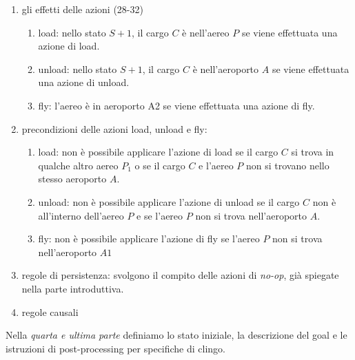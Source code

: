\begin{enumerate}
\item gli effetti delle azioni (28-32)
\begin{enumerate}
\item load: nello stato $S+1$, il cargo $C$ è nell'aereo $P$ se viene effettuata una azione di load.
\item unload: nello stato $S+1$, il cargo $C$ è nell'aeroporto $A$ se viene effettuata una azione di unload.
\item fly: l'aereo è in aeroporto A2 se viene effettuata una azione di fly.
\end{enumerate}

\item precondizioni delle azioni load, unload e fly:
\begin{enumerate}
\item load: non è possibile applicare l'azione di load se il cargo $C$ si trova in qualche altro aereo $P_1$ o se il cargo $C$ e l'aereo $P$ non si trovano nello stesso aeroporto $A$.
\item unload: non è possibile applicare l'azione di unload se il cargo $C$ non è all'interno dell'aereo $P$ e se l'aereo $P$ non si trova nell'aeroporto $A$.
\item fly: non è possibile applicare l'azione di fly se l'aereo $P$ non si trova nell'aeroporto $A1$
\end{enumerate}

\item regole di persistenza: svolgono il compito delle azioni di \emph{no-op}, già spiegate nella parte introduttiva.

\item regole causali

\end{enumerate}

Nella \emph{quarta e ultima parte} definiamo lo stato iniziale, la descrizione del goal e le istruzioni di post-processing per specifiche di clingo.
